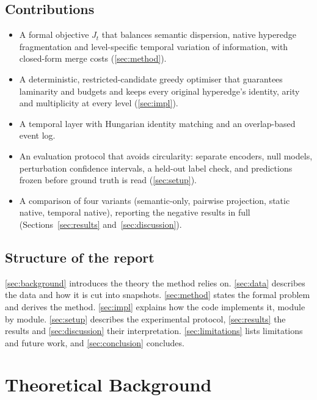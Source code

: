 \documentclass[11pt,a4paper]{article}
\newcommand{\cref}[1]{\autoref{#1}}
\newcommand{\Cref}[1]{\autoref{#1}}
\theoremstyle{remark}
\begin{document}
\subsection{Contributions}

\begin{itemize}
  \item A formal objective $J_t$ that balances semantic dispersion, native hyperedge
        fragmentation and level-specific temporal variation of information, with
        closed-form merge costs (\cref{sec:method}).
  \item A deterministic, restricted-candidate greedy optimiser that guarantees
        laminarity and budgets and keeps every original hyperedge's identity, arity and
        multiplicity at every level (\cref{sec:impl}).
  \item A temporal layer with Hungarian identity matching and an overlap-based
        event log.
  \item An evaluation protocol that avoids circularity: separate encoders, null
        models, perturbation confidence intervals, a held-out label check, and
        predictions frozen before ground truth is read (\cref{sec:setup}).
  \item A comparison of four variants (semantic-only, pairwise projection, static
        native, temporal native), reporting the negative results in full
        (Sections~\ref{sec:results} and~\ref{sec:discussion}).
\end{itemize}

\subsection{Structure of the report}

\Cref{sec:background} introduces the theory the method relies on.
\Cref{sec:data} describes the data and how it is cut into snapshots.
\Cref{sec:method} states the formal problem and derives the method.
\Cref{sec:impl} explains how the code implements it, module by module.
\Cref{sec:setup} describes the experimental protocol, \cref{sec:results} the
results and \cref{sec:discussion} their interpretation.
\Cref{sec:limitations} lists limitations and future work, and
\cref{sec:conclusion} concludes.

\section{Theoretical Background}
\label{sec:background}
\end{document}
